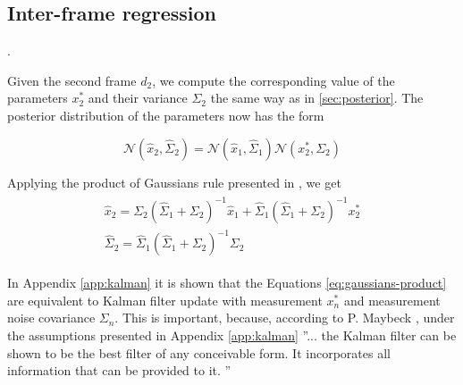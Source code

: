 \subsection{Inter-frame regression } 
\label{sec:combining}
.

Given the second frame $d_2$, we compute the corresponding value of the parameters $x_2^*$ and their variance $\Sigma_2$ the same way as in \ref{sec:posterior}. The posterior distribution of the parameters now has the form 

\begin{equation}
\mathcal{N}(\hat{x}_2, \hat{\Sigma}_2) = \mathcal{N}(\hat{x}_1, \hat{\Sigma}_1) \mathcal{N}(x_2^*, \Sigma_2)
\end{equation}

Applying the product of Gaussians rule presented in \cite{petersen2008matrix}, we get 
\begin{align}
\begin{split}
\hat{x}_2 = \Sigma_2 (\hat{\Sigma}_1 + \Sigma_2)^{-1} \hat{x}_1 + 
\hat{\Sigma}_1 (\hat{\Sigma}_1 + \Sigma_2)^{-1} x_2^*\\
\hat{\Sigma}_2 = \hat{\Sigma}_1 (\hat{\Sigma}_1 + \Sigma_2)^{-1} \Sigma_2
\end{split} \label{eq:gaussians-product}
\end{align}

In Appendix \ref{app:kalman} it is shown that the Equations \ref{eq:gaussians-product} are equivalent to Kalman filter update with measurement $x_n^*$ and measurement noise covariance $\Sigma_n$. This is important, because, according to P. Maybeck \cite{maybeck1979stochastic}, under the assumptions presented in Appendix \ref{app:kalman} ''... the Kalman filter can be shown to be the best filter of any conceivable form. It incorporates all information that can be provided to it. ''

